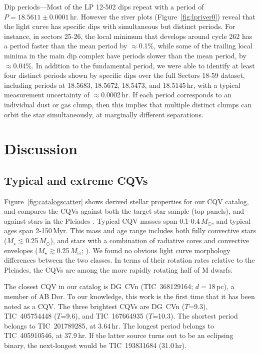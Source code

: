 \documentclass[11pt,twocolumn,tighten]{aastex63}
\begin{document}
{\sc Dip periods}---Most of the LP 12-502 dips repeat with a period of
$P=18.5611 \pm 0.0001$\,hr.  However the river plots
(Figure~\ref{fig:lpriver0}) reveal that the light curve has specific
dips with simultaneous but distinct periods.  For instance, in sectors
25-26, the local minimum that develops around cycle 262 has a period
faster than the mean period by $\approx$0.1\%, while some of the
trailing local minima in the main dip complex have periods slower than
the mean period, by $\approx$0.04\%.  In addition to the fundamental
period, we were able to identify at least four distinct periods shown
by specific dips over the full Sectors 18-59 dataset, including
periods at 18.5683, 18.5672, 18.5473, and 18.5145\,hr, with a typical
measurement uncertainty of $\approx$0.0002\,hr.  If each period
corresponds to an individual dust or gas clump, then this implies that
multiple distinct clumps can orbit the star simultaneously, at
marginally different separations.



\section{Discussion}
\label{sec:discussion}


\subsection{Typical and extreme CQVs}
\label{subsec:extreme}

Figure~\ref{fig:catalogscatter} shows derived stellar properties for
our CQV catalog, and compares the CQVs against both the target star
sample (top panels), and against stars in the Pleiades
\citep{2016AJ....152..114R}.  Typical CQV masses span
0.1-0.4\,$M_\odot$, and typical ages span 2-150\,Myr.  This mass and
age range includes both fully convective stars
($M_\star$$\lesssim$0.25\,$M_\odot$), and stars with a combination of
radiative cores and convective envelopes
($M_\star$$\gtrsim$0.25\,$M_\odot$; \citealt{2018A&A...619A.177B}).
We found no obvious light curve morphology differences between the two
classes.  In terms of their rotation rates relative to the Pleiades,
the CQVs are among the more rapidly rotating half of M dwarfs. 

The closest CQV in our catalog is DG~CVn (TIC~368129164;
$d$$=$18\,pc), a member of AB Dor.  To our knowledge, this work is the
first time that it has been noted as a CQV.  The three brightest CQVs
are DG~CVn ($T$=9.3), TIC~405754448 ($T$=9.6), and TIC~167664935
($T$=10.3).  The shortest period belongs to TIC~201789285, at
3.64\,hr.  The longest period belongs to TIC~405910546, at 37.9\,hr.
If the latter source turns out to be an eclipsing binary, the
next-longest would be TIC~193831684 (31.0\,hr).
\end{document}
